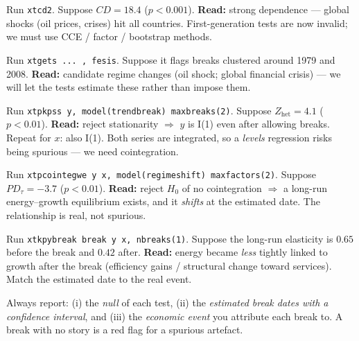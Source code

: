 \documentclass[11pt,a4paper]{article}
\newcommand{\Ito}{I(1)}
\newcommand{\cmd}[1]{\texttt{\textcolor{camber}{#1}}}
\theoremstyle{definition}
\begin{document}
\begin{exbox}
Run \cmd{xtcd2}. Suppose $CD=18.4$ ($p<0.001$). \textbf{Read:} strong dependence --- global shocks
(oil prices, crises) hit all countries. First-generation tests are now invalid; we must use CCE /
factor / bootstrap methods.
\end{exbox}
\begin{exbox}
Run \cmd{xtgets ... , fesis}. Suppose it flags breaks clustered around 1979 and 2008. \textbf{Read:}
candidate regime changes (oil shock; global financial crisis) --- we will let the tests estimate these
rather than impose them.
\end{exbox}
\begin{exbox}
Run \cmd{xtpkpss y, model(trendbreak) maxbreaks(2)}. Suppose $Z_{\mathrm{het}}=4.1$ ($p<0.01$).
\textbf{Read:} reject stationarity $\Rightarrow$ $y$ is \Ito{} even after allowing breaks. Repeat for
$x$: also \Ito. Both series are integrated, so a \emph{levels} regression risks being spurious ---
we need cointegration.
\end{exbox}
\begin{exbox}
Run \cmd{xtpcointegwe y x, model(regimeshift) maxfactors(2)}. Suppose $PD_\tau=-3.7$ ($p<0.01$).
\textbf{Read:} reject $H_0$ of no cointegration $\Rightarrow$ a long-run energy--growth equilibrium
exists, and it \emph{shifts} at the estimated date. The relationship is real, not spurious.
\end{exbox}
\begin{exbox}
Run \cmd{xtkpybreak break y x, nbreaks(1)}. Suppose the long-run elasticity is $0.65$ before the break
and $0.42$ after. \textbf{Read:} energy became \emph{less} tightly linked to growth after the break
(efficiency gains / structural change toward services). Match the estimated date to the real event.
\end{exbox}
\begin{warnbox}
Always report: (i) the \emph{null} of each test, (ii) the \emph{estimated break dates with a
confidence interval}, and (iii) the \emph{economic event} you attribute each break to. A break with
no story is a red flag for a spurious artefact.
\end{warnbox}

\end{document}
